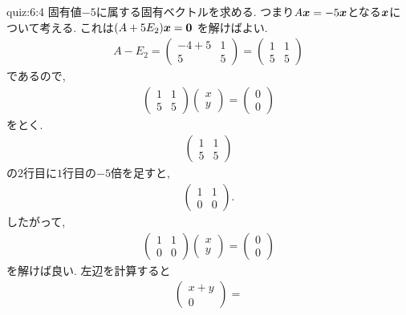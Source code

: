 \begin{answerof}{quiz:6:4}
  固有値$-5$に属する固有ベクトルを求める.
  つまり$A\boldsymbol{x}=-5\boldsymbol{x}$となる$\boldsymbol{x}$について考える.
  これは$(A+5E_2)\boldsymbol{x}=\boldsymbol{0}$
  を解けばよい.
  \begin{align*}
    A-E_2=\begin{pmatrix}-4+5&1\\5&5\end{pmatrix}
    =\begin{pmatrix}1&1\\5&5\end{pmatrix}
  \end{align*}
  であるので,
  \begin{align*}
    \begin{pmatrix}1&1\\5&5\end{pmatrix}
    \begin{pmatrix}x\\y\end{pmatrix}=
    \begin{pmatrix}0\\0\end{pmatrix}
  \end{align*}
  をとく.
  \begin{align*}
    \begin{pmatrix}1&1\\5&5\end{pmatrix}
  \end{align*}
  の$2$行目に$1$行目の$-5$倍を足すと,
 \begin{align*}
    \begin{pmatrix}1&1\\0&0\end{pmatrix}.
  \end{align*}
 したがって,
  \begin{align*}
    \begin{pmatrix}1&1\\0&0\end{pmatrix}
      \begin{pmatrix}x\\y\end{pmatrix}
=
    \begin{pmatrix}0\\0\end{pmatrix}
  \end{align*}
  を解けば良い.
  左辺を計算すると
  \begin{align*}
    \begin{pmatrix}x+y\\0\end{pmatrix}=

\end{align*}
\end{answerof}
